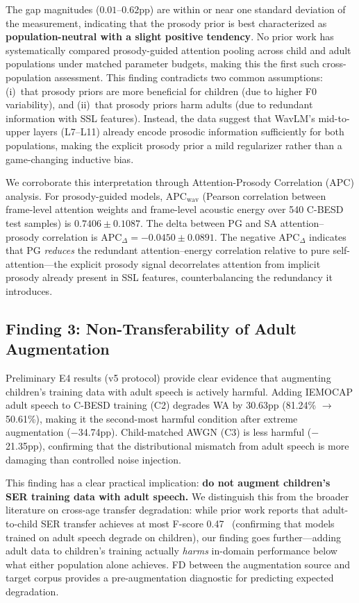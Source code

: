 \documentclass[11pt,a4paper]{article}
\begin{document}
The gap magnitudes ($0.01$--$0.62$pp) are within or near one standard deviation
of the measurement, indicating that the prosody prior is best characterized as
\textbf{population-neutral with a slight positive tendency}. No prior work has
systematically compared prosody-guided attention pooling across child and adult
populations under matched parameter budgets, making this the first such
cross-population assessment. This finding
contradicts two common assumptions: (i)~that prosody priors are more beneficial
for children (due to higher F0 variability), and (ii)~that prosody priors harm
adults (due to redundant information with SSL features). Instead, the data
suggest that WavLM's mid-to-upper layers (L7--L11) already encode prosodic
information sufficiently for both populations, making the explicit prosody
prior a mild
regularizer rather than a game-changing inductive bias.

We corroborate this interpretation through Attention-Prosody Correlation (APC)
analysis. For prosody-guided models, APC$_{\text{wav}}$ (Pearson correlation
between frame-level attention weights and frame-level acoustic energy over
540 C-BESD test samples) is $0.7406 \pm 0.1087$. The delta between PG and SA
attention--prosody correlation is APC$_{\Delta} = -0.0450 \pm 0.0891$. The
negative APC$_{\Delta}$ indicates that PG \textit{reduces} the redundant
attention--energy correlation relative to pure self-attention---the explicit
prosody signal decorrelates attention from implicit prosody already present in
SSL features, counterbalancing the redundancy it introduces.

\subsection{Finding 3: Non-Transferability of Adult Augmentation}

Preliminary E4 results (v5 protocol) provide clear evidence that augmenting
children's training data with adult speech is actively harmful. Adding IEMOCAP
adult speech to C-BESD training (C2) degrades WA by 30.63pp (81.24\%
$\rightarrow$ 50.61\%), making it the second-most harmful condition after
extreme augmentation ($-$34.74pp). Child-matched AWGN (C3) is less harmful
($-$21.35pp), confirming that the distributional mismatch from adult speech is
more damaging than controlled noise injection.

This finding has a clear practical implication: \textbf{do not augment
children's SER training data with adult speech.} We distinguish this from the
broader literature on cross-age transfer degradation: while prior work reports
that adult-to-child SER transfer achieves at most F-score
0.47~\cite{lesyk2024adult} (confirming that models trained on adult speech
degrade on children), our finding goes further---adding adult data to
children's training actually \textit{harms} in-domain performance below what
either population alone achieves. FD between the augmentation source and target
corpus provides a pre-augmentation diagnostic for predicting expected
degradation.
\end{document}
